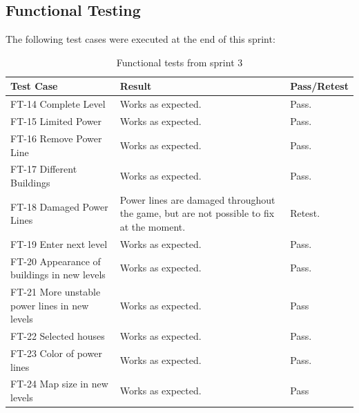 \subsection{Functional Testing}

	The following test cases were executed at the end of this sprint:


	\begin{table}
	\begin{tabular}{| p{3cm} | p{6.5cm} | p{2.5cm} |}
		\hline
		\rowcolor{lightgray}
		{\bf Test Case} & {\bf Result} & {\bf Pass/Retest} \\ \hline

	  	FT-14 Complete Level & Works as expected. & Pass. \\ \hline
	  	
	  	FT-15 Limited Power & Works as expected. & Pass. \\ \hline
	  	
	  	FT-16 Remove Power Line & Works as expected. & Pass. \\ \hline
	  		  	
	  	FT-17 Different Buildings & Works as expected. & Pass. \\ \hline

	  	FT-18 Damaged Power Lines & Power lines are damaged throughout the game, but are not possible 
	  	to fix at the moment. & Retest. \\ \hline
	  	
	  	FT-19 Enter next level & Works as expected. & Pass. \\ \hline

	  	FT-20 Appearance of buildings in new levels & Works as expected. & Pass. \\ \hline

	  	FT-21 More unstable power lines in new levels & Works as expected. & Pass \\ \hline

	  	FT-22 Selected houses & Works as expected. & Pass. \\ \hline

	  	FT-23 Color of power lines & Works as expected. & Pass. \\ \hline
	  	FT-24 Map size in new levels & Works as expected. & Pass \\ \hline

	\end{tabular}
	\caption{Functional tests from sprint 3}
	\end{table}

